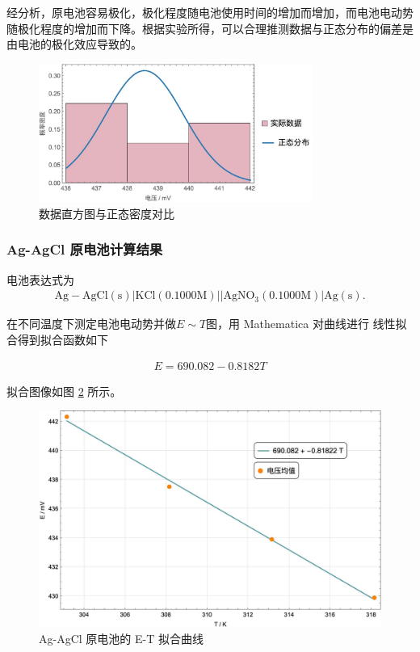 \documentclass[12pt]{ctexart}
\numberwithin{equation}{section}
\begin{document}
经分析，原电池容易极化，极化程度随电池使用时间的增加而增加，而电池电动势随极化程度的增加而下降。根据实验所得，可以合理推测数据与正态分布的偏差是由电池的极化效应导致的。


\begin{figure}[ht]
    \centering
    \includegraphics[width=0.8\textwidth]{Figure_2.jpg}
    \caption{数据直方图与正态密度对比}
    \label{fig:histo}
\end{figure}

\subsubsection{Ag-AgCl 原电池计算结果}
电池表达式为
\begin{align}
    \mathrm{Ag-AgCl(s)}|\mathrm{KCl}(0.1000 \mathrm{M})
    ||\mathrm{AgNO_3}(0.1000 \mathrm{M})|\mathrm{Ag(s)}.
\end{align}

在不同温度下测定电池电动势并做$E \sim T$图，用 Mathematica 对曲线进行
线性拟合得到拟合函数如下

\begin{align}
E = 690.082 - 0.8182 T 
\end{align}

拟合图像如图 \ref*{fig:linear} 所示。

\begin{figure}[!h]
    \centering
    \includegraphics[scale=0.4]{Figure_1.jpg}
    \caption{Ag-AgCl 原电池的 E-T 拟合曲线}
    \label{fig:linear}
\end{figure}
\end{document}

